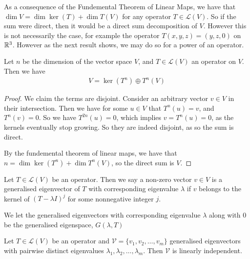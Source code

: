 \documentclass[]{article}
\begin{document}
As a consequence of the Fundemental Theorem of Linear Maps, we have that $\dim V = \dim \ker(T) + \dim T(V)$ for any operator $T \in \mathcal{L}(V)$. So if the sum were direct, then it would be a direct sum decomposition of $V$. However this is not necessarily the case, for example the operator $T(x,y,z) = (y,z,0)$ on $\mathbb{R}^3$. However as the next result shows, we may do so for a power of an operator.

\begin{thm}
		Let $n$ be the dimension of the vector space $V$, and $T \in \mathcal{L}(V)$ an operator on $V$. Then we have
		\begin{align*}
				V = \ker(T^{n}) \oplus T^n(V)
		\end{align*}
\end{thm}

\begin{proof}
		We claim the terms are disjoint. Consider an arbitrary vector $v \in V$ in their intersection. Then we have for some $u \in V$ that $T^n(u) = v$, and $T^n(v) = 0$. So we have $T^{2n}(u) = 0$, which implies $v = T^n(u) = 0$, as the kernels eventually stop growing. So they are indeed disjoint, as so the sum is direct.

		By the fundemental theorem of linear maps, we have that $n = \dim \ker (T^n) + \dim T^n(V)$, so the direct sum is $V$.
\end{proof}

\begin{defi} 
		Let $T \in \mathcal{L}(V)$ be an operator. Then we say a non-zero vector $v \in V$ is a generalised eigenvector of $T$ with corresponding eigenvalue $\lambda$ if $v$ belongs to the kernel of $(T - \lambda I)^{j}$ for some nonnegative integer $j$.	

		We let the generalised eigenvectors with corresponding eigenvalue $\lambda$ along with $0$ be the generalised eigenspace, $G(\lambda, T)$
\end{defi}

\begin{thm}
		Let $T \in \mathcal{L}(V)$ be an operator and $\mathcal{V} = \{v_1,v_2,\ldots,v_m\}$ generalised eigenvectors with pairwise distinct eigenvalues $\lambda_1,\lambda_2,\ldots,\lambda_m$. Then $\mathcal{V}$ is linearly independent.
\end{thm}
\end{document}
